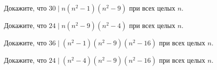 
\begin{problems}

\item
Докажите, что $30 \mid n (n^2 - 1) (n^2 - 9)$ при всех целых $n$.

\item
Докажите, что $24 \mid n (n^2 - 9) (n^2 - 4)$ при всех целых $n$.

\item
Докажите, что $36 \mid (n^2 - 1) (n^2 - 9) (n^2 - 16)$ при всех целых $n$.

\item
Докажите, что $24 \mid (n^2 - 4) (n^2 - 9) (n^2 - 16)$ при всех целых $n$.

\end{problems}

